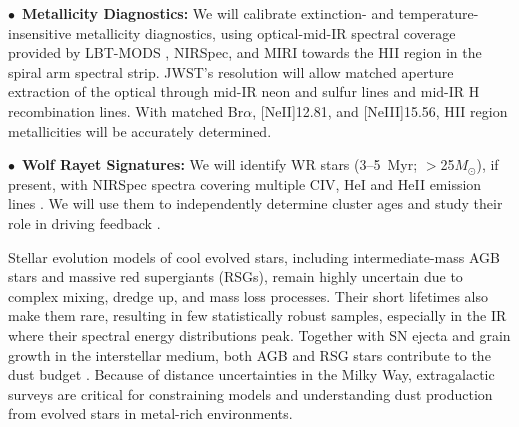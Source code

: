 \documentclass[12pt]{article}
\newenvironment{parhang}{\hangafter=1\hangindent=10pt}{\par}
\begin{document}
    \begin{parhang}
    \noindent
    $\bullet$~{\bf Metallicity Diagnostics:} We will calibrate extinction- and temperature-insensitive metallicity diagnostics, using optical-mid-IR spectral coverage provided by LBT-MODS \citep{croxall2015}, NIRSpec, and MIRI towards the H{\small II} region in the spiral arm spectral strip. JWST's resolution will allow matched aperture extraction of the optical through mid-IR neon and sulfur lines and mid-IR H recombination lines. With matched Br$\alpha$, [Ne{\small II}]12.81\micron, and [Ne{\small III}]15.56\micron, H{\small II} region metallicities will be accurately determined.
    \end{parhang}
     \begin{parhang}
    \noindent
    $\bullet$~{\bf Wolf Rayet Signatures:} We will identify WR stars (3--5~Myr; $>$25$M_\odot$), if present, with NIRSpec spectra  covering multiple C{\small IV}, He{\small I} and He{\small II} emission lines \citep{pasquali2002,kanarek2017}. We will use them to independently determine cluster ages and study their role in driving feedback \citep[e.g.,][]{sokal2016}. 
    \end{parhang}

\vspace{0.2\baselineskip}
 Stellar evolution models of cool evolved stars, including intermediate-mass AGB stars and massive red supergiants (RSGs), remain highly uncertain due to complex mixing, dredge up, and mass loss processes. Their short lifetimes also make them rare, resulting in few statistically robust samples, especially in the IR where their spectral energy distributions peak. Together with SN ejecta and grain growth in the interstellar medium, both AGB and RSG stars contribute to the dust budget \citep{matsuura2009,boyer2012,srinivasan2016}. Because of distance uncertainties in the Milky Way,  extragalactic surveys are critical for constraining models and understanding dust production from evolved stars in metal-rich environments. 
\end{document}
